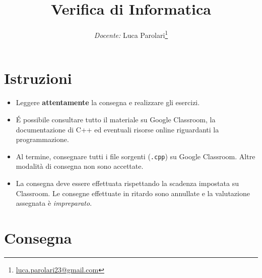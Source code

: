 \documentclass[addpoints,12pt,answers]{exam}
\title{Verifica di Informatica}
\author{\emph{Docente:} Luca Parolari\footnote{\href{mailto:luca.parolari23@gmail.com}{luca.parolari23@gmail.com}}}
\date{\vspace{-5ex}}
\begin{document}
    \maketitle


    \vspace*{\fill}

    \section*{Istruzioni}
    \begin{itemize}
        \item Leggere \textbf{attentamente} la consegna e realizzare
          gli esercizi.
        \item \'E possibile consultare tutto il materiale su Google
          Classroom, la documentazione di C++ ed eventuali risorse
          online riguardanti la programmazione.
        \item Al termine, consegnare tutti i file sorgenti
          (\texttt{.cpp}) su Google Classroom. Altre modalità di
          consegna non sono accettate.
        \item La consegna deve essere effettuata rispettando la
          scadenza impostata su Classroom. Le consegne effettuate in
          ritardo sono annullate e la valutazione assegnata è
          \emph{impreparato}.
    \end{itemize}

    \tableofcontents

    \vspace*{\fill}
    \pagebreak

    \section{Consegna}
\end{document}
